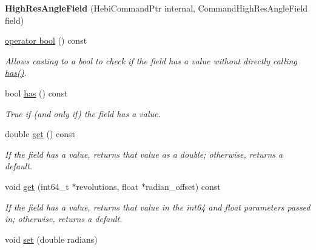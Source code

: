 \begin{DoxyCompactItemize}
\item 
{\bfseries High\+Res\+Angle\+Field} (Hebi\+Command\+Ptr internal, Command\+High\+Res\+Angle\+Field field)\hypertarget{classhebi_1_1Command_1_1HighResAngleField_aaf8bed01fb55cacfc0d2e9965469c8f0}{}\label{classhebi_1_1Command_1_1HighResAngleField_aaf8bed01fb55cacfc0d2e9965469c8f0}

\item 
\hyperlink{classhebi_1_1Command_1_1HighResAngleField_a2cc4e740bd11af44140a446164b49d81}{operator bool} () const 
\begin{DoxyCompactList}\small\item\em Allows casting to a bool to check if the field has a value without directly calling {\ttfamily \hyperlink{classhebi_1_1Command_1_1HighResAngleField_aa8015d3d55a4205021f42a354e2b84a9}{has()}}. \end{DoxyCompactList}\item 
bool \hyperlink{classhebi_1_1Command_1_1HighResAngleField_aa8015d3d55a4205021f42a354e2b84a9}{has} () const \hypertarget{classhebi_1_1Command_1_1HighResAngleField_aa8015d3d55a4205021f42a354e2b84a9}{}\label{classhebi_1_1Command_1_1HighResAngleField_aa8015d3d55a4205021f42a354e2b84a9}

\begin{DoxyCompactList}\small\item\em True if (and only if) the field has a value. \end{DoxyCompactList}\item 
double \hyperlink{classhebi_1_1Command_1_1HighResAngleField_aa6be447c47691c4f1d5edb3797a99025}{get} () const 
\begin{DoxyCompactList}\small\item\em If the field has a value, returns that value as a double; otherwise, returns a default. \end{DoxyCompactList}\item 
void \hyperlink{classhebi_1_1Command_1_1HighResAngleField_ac00b4014c5b81ce1e44da92bb5989953}{get} (int64\+\_\+t $\ast$revolutions, float $\ast$radian\+\_\+offset) const 
\begin{DoxyCompactList}\small\item\em If the field has a value, returns that value in the int64 and float parameters passed in; otherwise, returns a default. \end{DoxyCompactList}\item 
void \hyperlink{classhebi_1_1Command_1_1HighResAngleField_aa166a76f8a6ea47b62dd53bee853fe90}{set} (double radians)\hypertarget{classhebi_1_1Command_1_1HighResAngleField_aa166a76f8a6ea47b62dd53bee853fe90}{}\label{classhebi_1_1Command_1_1HighResAngleField_aa166a76f8a6ea47b62dd53bee853fe90}


\end{DoxyCompactItemize}
